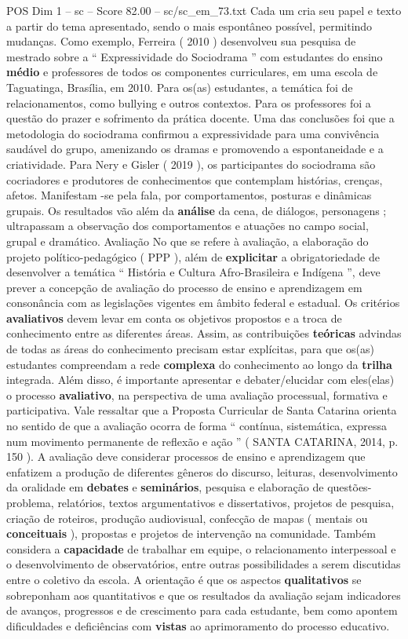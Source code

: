 \begin{textsample}{POS Dim 1 – sc – Score 82.00 – sc/sc\_em\_73.txt}
Cada um cria seu papel e texto a partir do tema apresentado, sendo o mais espontâneo possível, permitindo mudanças.
Como exemplo, Ferreira ( 2010 ) desenvolveu sua pesquisa de mestrado sobre a “ Expressividade do Sociodrama ” com estudantes do ensino \textbf{médio} e professores de todos os componentes curriculares, em uma escola de Taguatinga, Brasília, em 2010.
Para os(as) estudantes, a temática foi de relacionamentos, como bullying e outros contextos.
Para os professores foi a questão do prazer e sofrimento da prática docente.
Uma das conclusões foi que a metodologia do sociodrama confirmou a expressividade para uma convivência saudável do grupo, amenizando os dramas e promovendo a espontaneidade e a criatividade.
Para Nery e Gisler ( 2019 ), os participantes do sociodrama são cocriadores e produtores de conhecimentos que contemplam histórias, crenças, afetos.
Manifestam -se pela fala, por comportamentos, posturas e dinâmicas grupais.
Os resultados vão além da \textbf{análise} da cena, de diálogos, personagens ; ultrapassam a observação dos comportamentos e atuações no campo social, grupal e dramático.
Avaliação No que se refere à avaliação, a elaboração do projeto político-pedagógico ( PPP ), além de \textbf{explicitar} a obrigatoriedade de desenvolver a temática “ História e Cultura Afro-Brasileira e Indígena ”, deve prever a concepção de avaliação do processo de ensino e aprendizagem em consonância com as legislações vigentes em âmbito federal e estadual.
Os critérios \textbf{avaliativos} devem levar em conta os objetivos propostos e a troca de conhecimento entre as diferentes áreas.
Assim, as contribuições \textbf{teóricas} advindas de todas as áreas do conhecimento precisam estar explícitas, para que os(as) estudantes compreendam a rede \textbf{complexa} do conhecimento ao longo da \textbf{trilha} integrada.
Além disso, é importante apresentar e debater/elucidar com eles(elas) o processo \textbf{avaliativo}, na perspectiva de uma avaliação processual, formativa e participativa.
Vale ressaltar que a Proposta Curricular de Santa Catarina orienta no sentido de que a avaliação ocorra de forma “ contínua, sistemática, expressa num movimento permanente de reflexão e ação ” ( SANTA CATARINA, 2014, p. 150 ).
A avaliação deve considerar processos de ensino e aprendizagem que enfatizem a produção de diferentes gêneros do discurso, leituras, desenvolvimento da oralidade em \textbf{debates} e \textbf{seminários}, pesquisa e elaboração de questões-problema, relatórios, textos argumentativos e dissertativos, projetos de pesquisa, criação de roteiros, produção audiovisual, confecção de mapas ( mentais ou \textbf{conceituais} ), propostas e projetos de intervenção na comunidade.
Também considera a \textbf{capacidade} de trabalhar em equipe, o relacionamento interpessoal e o desenvolvimento de observatórios, entre outras possibilidades a serem discutidas entre o coletivo da escola.
A orientação é que os aspectos \textbf{qualitativos} se sobreponham aos quantitativos e que os resultados da avaliação sejam indicadores de avanços, progressos e de crescimento para cada estudante, bem como apontem dificuldades e deficiências com \textbf{vistas} ao aprimoramento do processo educativo.


\end{textsample}
